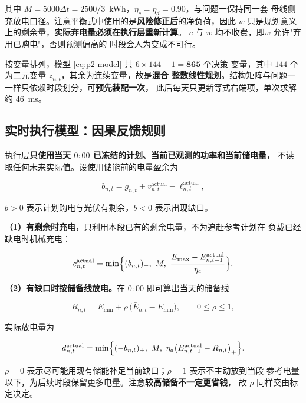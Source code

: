\documentclass[withoutpreface,bwprint]{cumcmthesis}
\begin{document}
其中 $M=5000\Delta t=2500/3$~kWh，$\eta_c=\eta_d=0.90$，与问题一保持同一套
母线侧充放电口径。注意平衡式中使用的是\textbf{风险修正后}的净负荷，因此
$\bar w$ 只是规划意义上的剩余量，\textbf{实际弃电量必须在执行层重新计算}。
$\bar c$ 与 $\bar w$ 均不收费，即$\bar w$ 允许"弃用已购电"，否则预测偏高的
时段会人为变成不可行。

按变量排列，模型 \eqref{eq:p2-model} 共 $6\times144+1=\mathbf{865}$ 个决策
变量，其中 $144$ 个为二元变量 $z_{n,t}$，其余为连续变量，故是\textbf{混合
整数线性规划}。结构矩阵与问题一一样只依赖时段划分，可\textbf{预先装配一次}，
此后每天只更新等式右端项，单次求解约 $46$~ms。

\subsection{实时执行模型：因果反馈规则}

执行层\textbf{只使用当天 $0{:}00$ 已冻结的计划、当前已观测的功率和当前储电量}，
不读取任何未来实际值。设使用储能前的电量盈余为

\begin{equation}
  b_{n,t}=g_{n,t}+v_{n,t}^{\mathrm{actual}}-\ell_{n,t}^{\mathrm{actual}} ,
  \label{eq:p2-surplus}
\end{equation}

$b>0$ 表示计划购电与光伏有剩余，$b<0$ 表示出现缺口。

\textbf{（1）有剩余时充电}，只利用本段已有的剩余电量，不为追赶参考计划在
负载已经缺电时机械充电：

\begin{equation}
  c_{n,t}^{\mathrm{actual}}
  =\min\Bigl\{(b_{n,t})_+,\ M,\
  \frac{E_{\max}-E_{n,t-1}^{\mathrm{actual}}}{\eta_c}\Bigr\} .
  \label{eq:p2-charge}
\end{equation}

\textbf{（2）有缺口时按储备线放电。}在 $0{:}00$ 即可算出当天的储备线

\begin{equation}
  R_{n,t}=E_{\min}+\rho\,\bigl(\bar E_{n,t}-E_{\min}\bigr),\qquad 0\le\rho\le1 ,
  \label{eq:p2-reserve}
\end{equation}

实际放电量为

\begin{equation}
  d_{n,t}^{\mathrm{actual}}
  =\min\Bigl\{(-b_{n,t})_+,\ M,\
  \eta_d\bigl(E_{n,t-1}^{\mathrm{actual}}-R_{n,t}\bigr)_+\Bigr\} .
  \label{eq:p2-discharge}
\end{equation}

$\rho=0$ 表示尽可能用现有储能补足当前缺口；$\rho=1$ 表示不主动放到当段
参考电量以下，为后续时段保留更多电量。注意\textbf{较高储备不一定更省钱}，
故 $\rho$ 同样交由标定决定。
\end{document}
